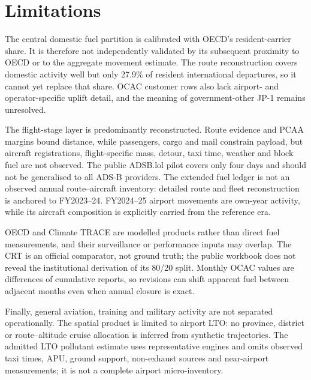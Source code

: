 \section{Limitations}
\label{sec:limitations}

The central domestic fuel partition is calibrated with OECD's resident-carrier share. It is
therefore not independently validated by its subsequent proximity to OECD or to the aggregate
movement estimate. The route reconstruction covers domestic activity well but only 27.9\% of
resident international departures, so it cannot yet replace that share. OCAC customer rows
also lack airport- and operator-specific uplift detail, and the meaning of government-other
JP-1 remains unresolved.

The flight-stage layer is predominantly reconstructed. Route evidence and PCAA margins bound
distance, while passengers, cargo and mail constrain payload, but aircraft registrations,
flight-specific mass, detour, taxi time, weather and block fuel are not observed. The public
ADSB.lol pilot covers only four days and should not be generalised to all ADS-B providers. The
extended fuel ledger is not an observed annual route--aircraft inventory: detailed route
and fleet reconstruction is anchored to FY2023--24. FY2024--25 airport movements are own-year activity, while its aircraft composition is explicitly carried from the reference era.

OECD and Climate TRACE are modelled products rather than direct fuel measurements, and their
surveillance or performance inputs may overlap. The CRT is an official comparator, not ground
truth; the public workbook does not reveal the institutional derivation of its 80/20 split.
Monthly OCAC values are differences of cumulative reports, so revisions can shift apparent
fuel between adjacent months even when annual closure is exact.

Finally, general aviation, training and military activity are not separated operationally.
The spatial product is limited to airport LTO: no province, district or route--altitude cruise
allocation is inferred from synthetic trajectories. The admitted LTO pollutant estimate uses
representative engines and omits observed taxi times, APU, ground support, non-exhaust sources
and near-airport measurements; it is not a complete airport micro-inventory.
